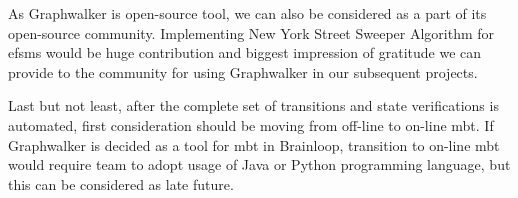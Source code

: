 \par
As Graphwalker is open-source tool,  we can also be considered as a part of its open-source community. Implementing New York Street Sweeper Algorithm for \acrshort{efsm}s would be huge contribution and biggest impression of gratitude we can provide to the community for using Graphwalker in our subsequent projects.

\par
Last but not least, after the complete set of transitions and state verifications is automated, first consideration should be moving from off-line to on-line \acrshort{mbt}. If Graphwalker is decided as a tool for \acrshort{mbt} in Brainloop, transition to on-line \acrshort{mbt} would require team to adopt usage of Java or Python programming language, but this can be considered as late future.